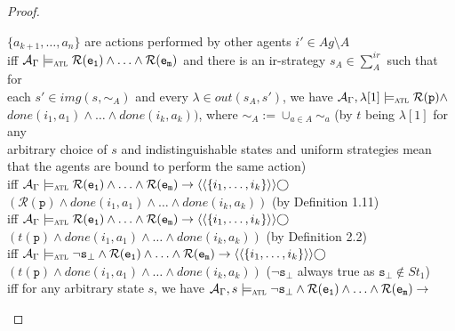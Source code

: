 \documentclass{article}
\theoremstyle{theorem}
\theoremstyle{lemma}
\theoremstyle{definition}
\theoremstyle{remark}
\begin{document}
\begin{proof}
\begin{tabbing}
    \>\>\> $\{a_{k+1}, \ldots, a_n\}$ are actions performed by other agents $i' \in Ag \text{\textbackslash} A$ \\
    \>\> iff $\mathcal{A}_\Gamma \models_\textsc{atl} \mathcal{R}(\texttt{e}_\texttt{1}) \wedge \ldots \wedge \mathcal{R}(\texttt{e}_\texttt{m})$ and there is an ir-strategy $s_A \in \sum_{A}^{ir}$ such that for \\
    \>\>\> each $s' \in img(s, \sim_A)$ and every $\lambda \in out(s_A, s')$, we have $\mathcal{A}_\Gamma, \lambda[1] \models_\textsc{atl} \mathcal{R}(\texttt{p}) \wedge$ \\
    \>\>\> $done(i_1,a_1) \wedge \ldots \wedge done(i_k,a_k))$, where $\sim_A:= \cup_{a \in A} \sim_a$ (by $t$ being $\lambda[1]$ for any \\
    \>\>\> arbitrary choice of $s$ and indistinguishable states and uniform strategies mean \\
    \>\>\> that the agents are bound to perform the same action) \\
    \>\> iff $\mathcal{A}_\Gamma \models_\textsc{atl} \mathcal{R}(\texttt{e}_\texttt{1}) \wedge \ldots \wedge \mathcal{R}(\texttt{e}_\texttt{m}) \rightarrow \langle \langle \{i_1,\ldots ,i_k\} \rangle \rangle \bigcirc$ \\
    \>\>\> $(\mathcal{R}(\texttt{p}) \wedge done(i_1,a_1) \wedge \ldots \wedge done(i_k,a_k))$ (by Definition 1.11)\\
    \>\> iff $\mathcal{A}_\Gamma \models_\textsc{atl} \mathcal{R}(\texttt{e}_\texttt{1}) \wedge \ldots \wedge \mathcal{R}(\texttt{e}_\texttt{m}) \rightarrow \langle \langle \{i_1,\ldots ,i_k\} \rangle \rangle \bigcirc$ \\
    \>\>\> $(t(\texttt{p}) \wedge done(i_1,a_1) \wedge \ldots \wedge done(i_k,a_k))$ (by Definition 2.2) \\
    \>\> iff $\mathcal{A}_\Gamma \models_\textsc{atl} \neg \texttt{s}_\bot \wedge \mathcal{R}(\texttt{e}_\texttt{1}) \wedge \ldots \wedge \mathcal{R}(\texttt{e}_\texttt{m}) \rightarrow \langle \langle \{i_1,\ldots ,i_k\} \rangle \rangle \bigcirc$ \\
    \>\>\> $(t(\texttt{p}) \wedge done(i_1,a_1) \wedge \ldots \wedge done(i_k,a_k))$ ($\neg \texttt{s}_\bot$ always true as $\texttt{s}_\bot \not \in St_1$)\\
    \>\> iff for any arbitrary state $s$, we have $\mathcal{A}_\Gamma, s \models_\textsc{atl} \neg \texttt{s}_\bot \wedge \mathcal{R}(\texttt{e}_\texttt{1}) \wedge \ldots \wedge \mathcal{R}(\texttt{e}_\texttt{m}) \rightarrow $ \\

\end{tabbing}
\end{proof}
\end{document}
